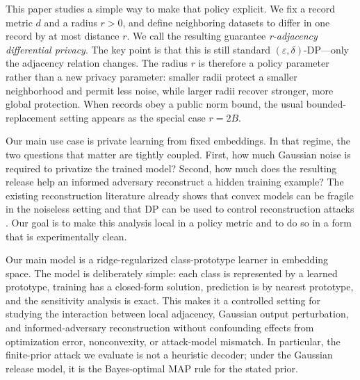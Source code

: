 \documentclass[conference,compsoc]{IEEEtran}
\begin{document}
This paper studies a simple way to make that policy explicit. We fix a record metric $d$ and a radius $r>0$, and define neighboring datasets to differ in one record by at most distance $r$. We call the resulting guarantee \emph{r-adjacency differential privacy}. The key point is that this is still standard $(\varepsilon,\delta)$-DP---only the adjacency relation changes. The radius $r$ is therefore a policy parameter rather than a new privacy parameter: smaller radii protect a smaller neighborhood and permit less noise, while larger radii recover stronger, more global protection. When records obey a public norm bound, the usual bounded-replacement setting appears as the special case $r=2B$.

Our main use case is private learning from fixed embeddings. In that regime, the two questions that matter are tightly coupled. First, how much Gaussian noise is required to privatize the trained model? Second, how much does the resulting release help an informed adversary reconstruct a hidden training example? The existing reconstruction literature already shows that convex models can be fragile in the noiseless setting and that DP can be used to control reconstruction attacks \cite{balle2022informed,hayes2023bounding}. Our goal is to make this analysis local in a policy metric and to do so in a form that is experimentally clean.

Our main model is a ridge-regularized class-prototype learner in embedding space. The model is deliberately simple: each class is represented by a learned prototype, training has a closed-form solution, prediction is by nearest prototype, and the sensitivity analysis is exact. This makes it a controlled setting for studying the interaction between local adjacency, Gaussian output perturbation, and informed-adversary reconstruction without confounding effects from optimization error, nonconvexity, or attack-model mismatch. In particular, the finite-prior attack we evaluate is not a heuristic decoder; under the Gaussian release model, it is the Bayes-optimal MAP rule for the stated prior.
\end{document}
